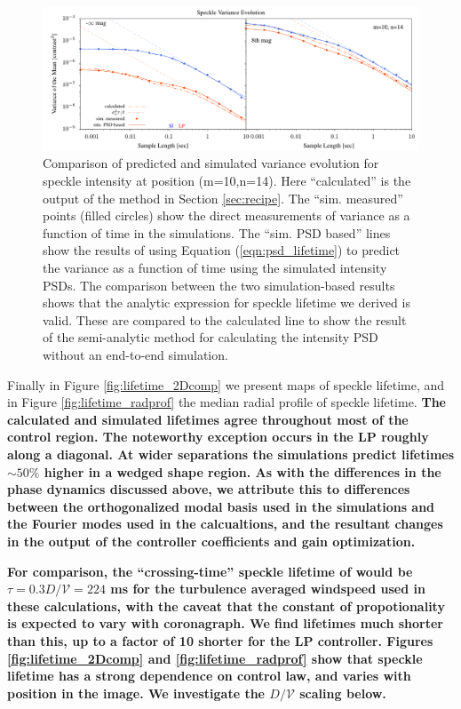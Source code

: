 \documentclass[10pt,preprint]{aastex631}
\begin{document}
\begin{figure}
\hspace{-0.3in}
\includegraphics[width=6.5in]{binVarComp_lp_10_14.pdf}
\caption{Comparison of predicted and simulated variance evolution for speckle intensity at position (m=10,n=14).  Here ``calculated'' is the output of the method in Section \ref{sec:recipe}.  The ``sim. measured'' points (filled circles) show the direct measurements of variance as a function of time in the simulations.  The ``sim. PSD based'' lines show the results of using Equation (\ref{eqn:psd_lifetime}) to predict the variance as a function of time using the simulated intensity PSDs.  The comparison between the two simulation-based results shows that the analytic expression for speckle lifetime we derived is valid.  These are compared to the calculated line to show the result of the semi-analytic method for calculating the intensity PSD without an end-to-end simulation.  \label{fig:binvarcomp}}
\end{figure}

Finally in Figure \ref{fig:lifetime_2Dcomp} we present maps of speckle lifetime, and in Figure \ref{fig:lifetime_radprof} the median radial profile of speckle lifetime. \textbf{The calculated and simulated lifetimes agree throughout most of the control region.  The noteworthy exception occurs in the LP roughly along a diagonal.  At wider separations the simulations predict lifetimes $\sim 50\%$ higher in a wedged shape region.  As with the differences in the phase dynamics discussed above, we attribute this to differences between the orthogonalized modal basis used in the simulations and the Fourier modes used in the calcualtions, and the resultant changes in the output of the controller coefficients and gain optimization.}

\textbf{For comparison, the ``crossing-time'' speckle lifetime of \citet{2005SPIE.5903..170M} would be $\tau=0.3D/\mathcal{V} = 224$ ms for the turbulence averaged windspeed used in these calculations, with the caveat that the constant of propotionality is expected to vary with coronagraph. We find lifetimes much shorter than this, up to a factor of 10 shorter for the LP controller. Figures \ref{fig:lifetime_2Dcomp} and \ref{fig:lifetime_radprof} show that speckle lifetime has a strong dependence on control law, and varies with position in the image.  We investigate the $D/\mathcal{V}$ scaling below.}
\end{document}
